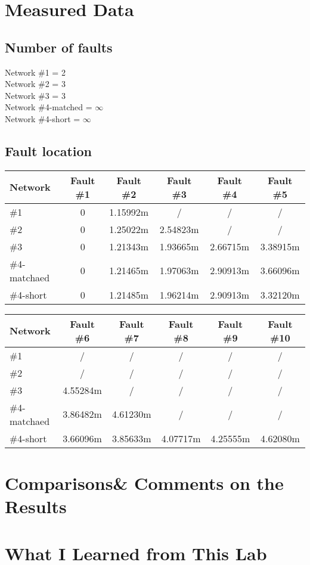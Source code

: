 \documentclass[11pt,oneside,a4paper]{report}
\begin{document}
\section*{Measured Data}
\subsection*{Number of faults}
Network \#1 = 2\\
Network \#2 = 3\\
Network \#3 = 3\\
Network \#4-matched = \(\infty\)\\
Network \#4-short = \(\infty\)
\subsection*{Fault location}
\begin{table}[htbp]
\begin{tabular}{lccccc}
\toprule
Network & Fault \#1 & Fault \#2 & Fault \#3 & Fault \#4 & Fault \#5 \\
\midrule
\#1 & 0 & 1.15992m & / & / & / \\
\#2 & 0 & 1.25022m & 2.54823m & / & / \\
\#3 & 0 & 1.21343m & 1.93665m & 2.66715m & 3.38915m \\
\#4-matchaed & 0 & 1.21465m & 1.97063m & 2.90913m & 3.66096m \\
\#4-short & 0 & 1.21485m & 1.96214m & 2.90913m & 3.32120m \\
\bottomrule
\end{tabular}
\end{table}

\begin{table}[htbp]
\begin{tabular}{lccccc}
\toprule
Network & Fault \#6 & Fault \#7 & Fault \#8 & Fault \#9 & Fault \#10 \\
\midrule
\#1 & / & / & / & / & / \\
\#2 & / & / & / & / & / \\
\#3 & 4.55284m & / & / & / & / \\
\#4-matchaed & 3.86482m & 4.61230m & / & / & / \\
\#4-short & 3.66096m & 3.85633m & 4.07717m & 4.25555m & 4.62080m \\
\bottomrule
\end{tabular}
\end{table}

\section*{Comparisons\& Comments on the Results}

\section*{What I Learned from This Lab}
\end{document}
